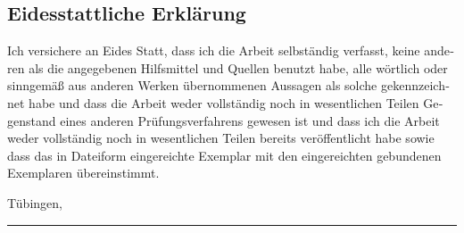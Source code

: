 \clearpage
\begin{otherlanguage}{ngerman}
\chapter*{Eidesstattliche Erklärung}
\thispagestyle{empty}

\noindent Ich versichere an Eides Statt, dass ich die Arbeit selbständig verfasst, keine anderen als die angegebenen Hilfsmittel und Quellen benutzt habe, alle wörtlich oder sinngemäß aus anderen Werken übernommenen Aussagen als solche gekennzeichnet habe und dass die Arbeit weder vollständig noch in wesentlichen Teilen Gegenstand eines anderen Prüfungsverfahrens gewesen ist und dass ich die Arbeit weder vollständig noch in wesentlichen Teilen bereits veröffentlicht habe sowie dass das in Dateiform eingereichte Exemplar mit den eingereichten gebundenen Exemplaren übereinstimmt.

\vspace{2.4cm}

\noindent Tübingen, \ThesisDate

\vspace{1.8cm}

\noindent\rule{0.45\textwidth}{0.4pt}\\
\ThesisAuthor

\end{otherlanguage}
\endgroup
